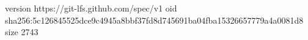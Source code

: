 version https://git-lfs.github.com/spec/v1
oid sha256:5c126845525dce9c4945a8bbf37fd8d745691ba04fba15326657779a4a0081d8
size 2743
